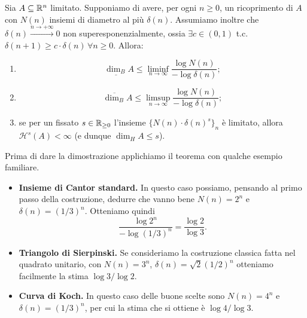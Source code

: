 \begin{teorema}
	Sia $A\subseteq\mathbb{R}^{n}$ limitato. Supponiamo di avere, per ogni $n\geq0$, un ricoprimento di $A$ con $N(n)$ insiemi di diametro al più $\delta(n)$. Assumiamo inoltre che $\delta(n)\xrightarrow{n\to+\infty}0$ non superesponenzialmente, ossia $\exists c\in(0,1)$ t.c. $\delta(n+1)\geq c\cdot\delta(n)\,\forall n\geq0$.
	Allora:
	\begin{enumerate}
		\item $$\underline{\dim_{B}}A \leq \liminf_{n\to\infty} \frac{\log N(n)}{-\log \delta(n)};$$
		\item $$\overline{\dim_{B}}A \leq \limsup_{n\to\infty} \frac{\log N(n)}{-\log \delta(n)};$$
		\item se per un fissato $s\in\mathbb{R}_{\geq0}$ l'insieme $\{N(n)\cdot \delta(n)^{s}\}_{n}$ è limitato, allora $\mathcal H^{s}(A) < \infty$ (e dunque $\dim_{H}A\leq s$).
	\end{enumerate}
\end{teorema}

Prima di dare la dimostrazione applichiamo il teorema con qualche esempio familiare. 
\begin{esempio}
	\begin{itemize}
		\item \textbf{Insieme di Cantor standard.} In questo caso possiamo, pensando al primo passo della costruzione, dedurre che vanno bene $N(n) = 2^{n}$ e $\delta(n) = (1/3)^{n}$. Otteniamo quindi 
		$$\frac{\log 2^{n}}{-\log(1/3)^{n}} = \frac{\log 2}{\log 3}.$$ 
		\item \textbf{Triangolo di Sierpinski.} Se consideriamo la costruzione classica fatta nel quadrato unitario, con $N(n) = 3^{n}$, $\delta(n) = \sqrt 2(1/2)^{n}$ otteniamo facilmente la stima $\log3/\log2$.
		\item \textbf{Curva di Koch.} In questo caso delle buone scelte sono $N(n) = 4^{n}$ e $\delta(n) = (1/3)^{n}$, per cui la stima che si ottiene è $\log4/\log3$.
	\end{itemize}
\end{esempio}

